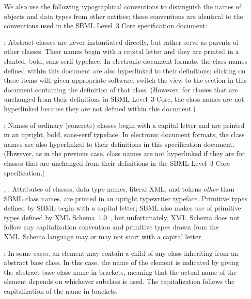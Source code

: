\documentclass[draftspec]{sbmlpkgspec}
\begin{document}
We also use the following typographical conventions to distinguish the
names of objects and data types from other entities; these conventions
are identical to the conventions used in the SBML Level~3 Core specification
document:

\begin{description}
  
\item {}: Abstract classes are never
  instantiated directly, but rather serve as parents of other classes.
  Their names begin with a capital letter and they are printed in a
  slanted, bold, sans-serif typeface.  In electronic document formats,
  the class names defined within this document are also hyperlinked to
  their definitions; clicking on these items will, given appropriate
  software, switch the view to the section in this document containing
  the definition of that class.  (However, for classes that are
  unchanged from their definitions in SBML Level~3 Core, the class names
  are not hyperlinked because they are not defined within this
  document.)
  
\item {}: Names of ordinary (concrete) classes begin with a
  capital letter and are printed in an upright, bold, sans-serif
  typeface.  In electronic document formats, the class names are also
  hyperlinked to their definitions in this specification document.
  (However, as in the previous case, class names are not hyperlinked if
  they are for classes that are unchanged from their definitions in the
  SBML Level~3 Core specification.)

\item {}, : Attributes of classes, data
  type names, literal XML, and tokens \emph{other} than SBML class
  names, are printed in an upright typewriter typeface.  Primitive types
  defined by SBML begin with a capital letter; SBML also makes use of
  primitive types defined by XML
  Schema~1.0~\citep{biron:2000,fallside:2000,thompson:2000}, but
  unfortunately, XML~Schema does not follow any capitalization
  convention and primitive types drawn from the XML~Schema language may
  or may not start with a capital letter.

\item \token{[elementName]}:  In some cases, an element may contain a child of any class inheriting from an abstract base class.  In this case, the name of the element is indicated by giving the abstract base class name in brackets, meaning that the actual name of the element depends on whichever subclass is used. The capitalization follows the capitalization of the name in brackets.

\end{description}
\end{document}
